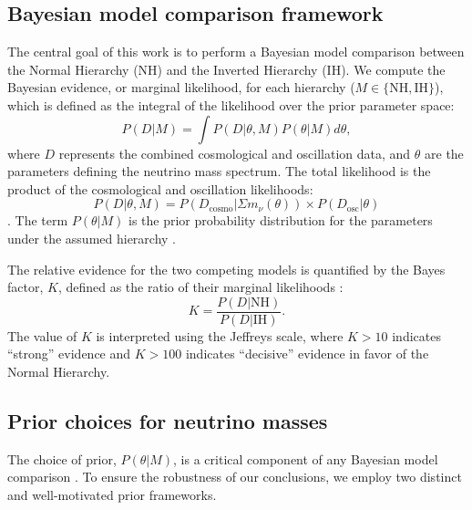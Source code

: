 \documentclass[]{article}
\begin{document}
\subsection{Bayesian model comparison framework}
The central goal of this work is to perform a Bayesian model comparison \citep{thorngren2025bayesianmodelcomparisonsignificance} between the Normal Hierarchy (NH) and the Inverted Hierarchy (IH). We compute the Bayesian evidence, or marginal likelihood, for each hierarchy ($M \in \{\text{NH}, \text{IH}\}$), which is defined as the integral of the likelihood over the prior parameter space:
\begin{equation}P(D|M) = \int P(D|\theta, M) P(\theta|M) d\theta,\end{equation}
where $D$ represents the combined cosmological and oscillation data, and $\theta$ are the parameters defining the neutrino mass spectrum. The total likelihood is the product of the cosmological and oscillation likelihoods:
\[P(D|\theta, M) = P(D_{\text{cosmo}}|\Sigma m_\nu(\theta)) \times P(D_{\text{osc}}|\theta)\]
\citep{giusarma2012testingstandardnonstandardneutrino,barua2026cosmologicalconstraintsneutrinomasses}. The term $P(\theta|M)$ is the prior probability distribution for the parameters under the assumed hierarchy \citep{barua2026cosmologicalconstraintsneutrinomasses}.

The relative evidence for the two competing models is quantified by the Bayes factor, $K$, defined as the ratio of their marginal likelihoods \citep{chib2016bayesfactorconsistency,mattei2020parsimonioustourbayesianmodel,kim2024deepbayesfactors}:
\begin{equation}K = \frac{P(D|\text{NH})}{P(D|\text{IH})}.\end{equation}
The value of $K$ is interpreted using the Jeffreys scale, where $K > 10$ indicates ``strong'' evidence and $K > 100$ indicates ``decisive'' evidence in favor of the Normal Hierarchy. \citep{dudbridge2024scaleinterpretationlikelihoodratios}

\subsection{Prior choices for neutrino masses}
The choice of prior, $P(\theta|M)$, is a critical component of any Bayesian model comparison \citep{bayarri2012criteriabayesianmodelchoice,llorente2022safeusepriordensities}. To ensure the robustness of our conclusions, we employ two distinct and well-motivated prior frameworks.
\end{document}
